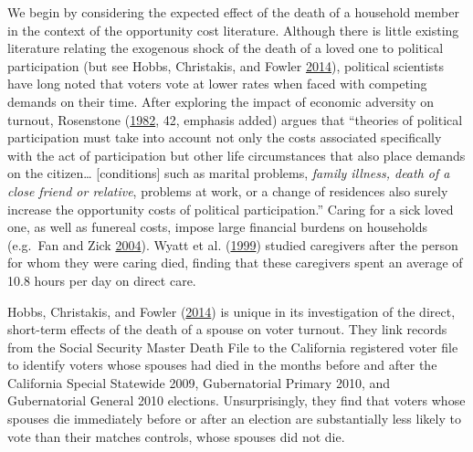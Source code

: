 \documentclass[
  12pt,
]{article}
\begin{document}
We begin by considering the expected effect of the death of a household member in the context of the opportunity cost literature. Although there is little existing literature relating the exogenous shock of the death of a loved one to political participation (but see Hobbs, Christakis, and Fowler \protect\hyperlink{ref-Hobbs2014}{2014}), political scientists have long noted that voters vote at lower rates when faced with competing demands on their time. After exploring the impact of economic adversity on turnout, Rosenstone (\protect\hyperlink{ref-Rosenstone1982}{1982}, 42, emphasis added) argues that ``theories of political participation must take into account not only the costs associated specifically with the act of participation but other life circumstances that also place demands on the citizen\ldots{} {[}conditions{]} such as marital problems, \emph{family illness, death of a close friend or relative}, problems at work, or a change of residences also surely increase the opportunity costs of political participation.'' Caring for a sick loved one, as well as funereal costs, impose large financial burdens on households (e.g.~Fan and Zick \protect\hyperlink{ref-Fan2004}{2004}). Wyatt et al. (\protect\hyperlink{ref-Wyatt1999}{1999}) studied caregivers after the person for whom they were caring died, finding that these caregivers spent an average of 10.8 hours per day on direct care.

Hobbs, Christakis, and Fowler (\protect\hyperlink{ref-Hobbs2014}{2014}) is unique in its investigation of the direct, short-term effects of the death of a spouse on voter turnout. They link records from the Social Security Master Death File to the California registered voter file to identify voters whose spouses had died in the months before and after the California Special Statewide 2009, Gubernatorial Primary 2010, and Gubernatorial General 2010 elections. Unsurprisingly, they find that voters whose spouses die immediately before or after an election are substantially less likely to vote than their matches controls, whose spouses did not die.
\end{document}
